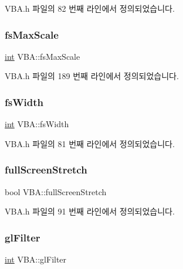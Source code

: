 V\+B\+A.\+h 파일의 82 번째 라인에서 정의되었습니다.

\mbox{\label{class_v_b_a_a1a4cfe79496ea8a029bc591f33c489d6}} 
\subsubsection{\texorpdfstring{fs\+Max\+Scale}{fsMaxScale}}
{\footnotesize\ttfamily \mbox{\hyperlink{_util_8cpp_a0ef32aa8672df19503a49fab2d0c8071}{int}} V\+B\+A\+::fs\+Max\+Scale}



V\+B\+A.\+h 파일의 189 번째 라인에서 정의되었습니다.

\mbox{\label{class_v_b_a_a92ef1c149914189da4d110d6dada54bb}} 
\subsubsection{\texorpdfstring{fs\+Width}{fsWidth}}
{\footnotesize\ttfamily \mbox{\hyperlink{_util_8cpp_a0ef32aa8672df19503a49fab2d0c8071}{int}} V\+B\+A\+::fs\+Width}



V\+B\+A.\+h 파일의 81 번째 라인에서 정의되었습니다.

\mbox{\label{class_v_b_a_a00bd5b85110bd763ad39eb4a9fb403a1}} 
\subsubsection{\texorpdfstring{full\+Screen\+Stretch}{fullScreenStretch}}
{\footnotesize\ttfamily bool V\+B\+A\+::full\+Screen\+Stretch}



V\+B\+A.\+h 파일의 91 번째 라인에서 정의되었습니다.

\mbox{\label{class_v_b_a_a7861cd60864163f310ae87f746eba9e6}} 
\subsubsection{\texorpdfstring{gl\+Filter}{glFilter}}
{\footnotesize\ttfamily \mbox{\hyperlink{_util_8cpp_a0ef32aa8672df19503a49fab2d0c8071}{int}} V\+B\+A\+::gl\+Filter}



